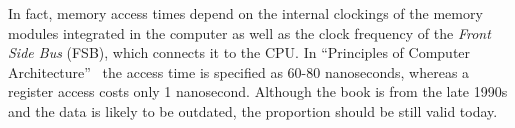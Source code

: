 In fact, memory access times depend on the internal clockings of the memory modules integrated in the computer as well as the clock frequency of the \emph{Front Side Bus} (FSB), which connects it to the CPU. In ``Principles of Computer Architecture''~\cite[p. 256]{murdocca1999computer} the access time is specified as 60-80 nanoseconds, whereas a register access costs only 1 nanosecond. Although the book is from the late 1990s and the data is likely to be outdated, the proportion should be still valid today.